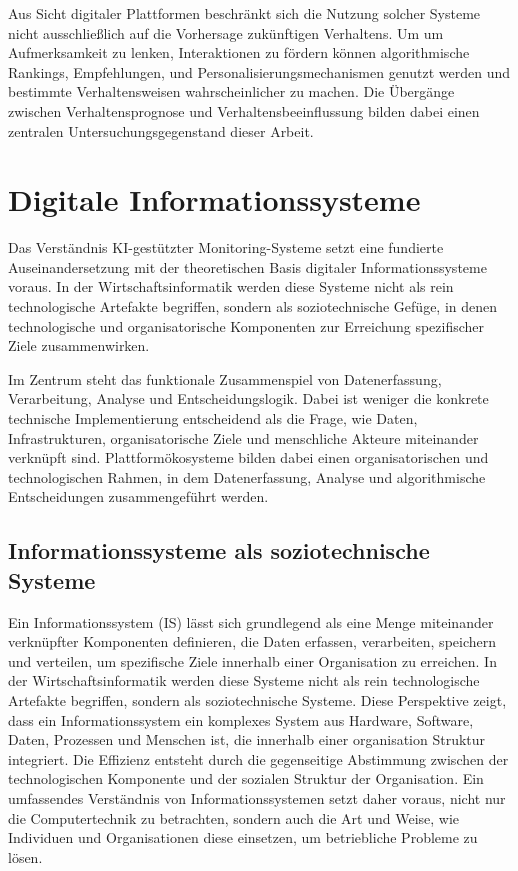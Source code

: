 Aus Sicht digitaler Plattformen beschränkt sich die Nutzung solcher Systeme nicht ausschließlich auf die Vorhersage zukünftigen Verhaltens. Um um Aufmerksamkeit zu lenken, Interaktionen zu fördern können algorithmische Rankings, Empfehlungen, und Personalisierungsmechanismen genutzt werden und bestimmte Verhaltensweisen wahrscheinlicher zu machen. Die Übergänge zwischen Verhaltensprognose und Verhaltensbeeinflussung bilden dabei einen zentralen Untersuchungsgegenstand dieser Arbeit.

\section{Digitale Informationssysteme}

Das Verständnis KI-gestützter Monitoring-Systeme setzt eine fundierte Auseinandersetzung mit der theoretischen Basis digitaler Informationssysteme voraus. In der Wirtschaftsinformatik werden diese Systeme nicht als rein technologische Artefakte begriffen, sondern als soziotechnische Gefüge, in denen technologische und organisatorische Komponenten zur Erreichung spezifischer Ziele zusammenwirken.

Im Zentrum steht das funktionale Zusammenspiel von Datenerfassung, Verarbeitung, Analyse und Entscheidungslogik. Dabei ist weniger die konkrete technische Implementierung entscheidend als die Frage, wie Daten, Infrastrukturen, organisatorische Ziele und menschliche Akteure miteinander verknüpft sind. Plattformökosysteme bilden dabei einen organisatorischen und technologischen Rahmen, in dem Datenerfassung, Analyse und algorithmische Entscheidungen zusammengeführt werden.

\subsection{Informationssysteme als soziotechnische Systeme}

Ein Informationssystem (IS) lässt sich grundlegend als eine Menge miteinander verknüpfter Komponenten definieren, die Daten erfassen, verarbeiten, speichern und verteilen, um spezifische Ziele innerhalb einer Organisation zu erreichen. In der Wirtschaftsinformatik werden diese Systeme nicht als rein technologische Artefakte begriffen, sondern als soziotechnische Systeme. Diese Perspektive zeigt, dass ein Informationssystem ein komplexes System aus Hardware, Software, Daten, Prozessen und Menschen ist, die innerhalb einer organisation Struktur integriert.  Die Effizienz entsteht durch die gegenseitige Abstimmung zwischen der technologischen Komponente und der sozialen Struktur der Organisation. Ein umfassendes Verständnis von Informationssystemen setzt daher voraus, nicht nur die Computertechnik zu betrachten, sondern auch die Art und Weise, wie Individuen und Organisationen diese einsetzen, um betriebliche Probleme zu lösen.

